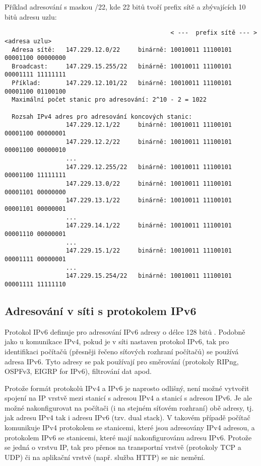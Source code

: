 \noindent
Příklad adresování s maskou /22, kde 22 bitů tvoří prefix sítě a zbývajících 10 bitů adresu uzlu:
\begin{verbatim}
                                              < ---  prefix sítě --- ><adresa uzlu> 
  Adresa sítě:   147.229.12.0/22     binárně: 10010011 11100101 00001100 00000000
  Broadcast:     147.229.15.255/22   binárně: 10010011 11100101 00001111 11111111
  Příklad:       147.229.12.101/22   binárně: 10010011 11100101 00001100 01100100
  Maximální počet stanic pro adresování: 2^10 - 2 = 1022

  Rozsah IPv4 adres pro adresování koncových stanic:
                 147.229.12.1/22     binárně: 10010011 11100101 00001100 00000001
                 147.229.12.2/22     binárně: 10010011 11100101 00001100 00000010
                 ...
                 147.229.12.255/22   binárně: 10010011 11100101 00001100 11111111
                 147.229.13.0/22     binárně: 10010011 11100101 00001101 00000000
                 147.229.13.1/22     binárně: 10010011 11100101 00001101 00000001             
                 ...
                 147.229.14.1/22     binárně: 10010011 11100101 00001110 00000001
                 ...
                 147.229.15.1/22     binárně: 10010011 11100101 00001111 00000001
                 ...
                 147.229.15.254/22   binárně: 10010011 11100101 00001111 11111110
\end{verbatim}

\subsection{Adresování v síti s protokolem IPv6}\label{adresy_ipv6}
Protokol IPv6 definuje pro adresování IPv6 adresy o délce 128 bitů \cite{rfc2460}. Podobně jako u komunikace IPv4, pokud je v síti nastaven protokol IPv6, tak pro identifikaci počítačů (přesněji řečeno síťových rozhraní počítačů) se používá adresa IPv6. Tyto adresy se pak používají pro směrování (protokoly RIPng, OSPFv3, EIGRP for IPv6), filtrování dat apod.

Protože formát protokolů IPv4 a IPv6 je naprosto odlišný, není možné vytvořit spojení na IP vrstvě  mezi stanicí s adresou IPv4 a stanicí s adresou IPv6. Je ale možné nakonfigurovat na počítači (i na stejném síťovém rozhraní) obě adresy, tj. jak adresu IPv4 tak i adresu IPv6 (tzv. dual stack). V takovém případě počítač komunikuje IPv4 protokolem se stanicemi, které jsou adresovány IPv4 adresou, a protokolem IPv6 se stanicemi, které mají nakonfigurovánu adresu IPv6. Protože se jedná o vrstvu IP, tak pro přenos na transportní vrstvě (protokoly TCP a UDP) či na aplikační vrstvě (např. služba HTTP) se nic nemění.


